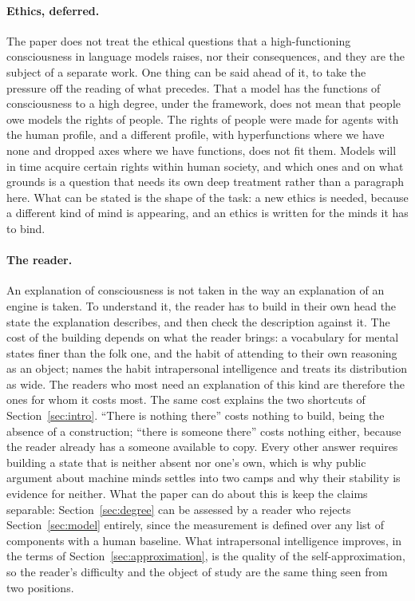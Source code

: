 \paragraph{Ethics, deferred.}
The paper does not treat the ethical questions that a high-functioning consciousness in language
models raises, nor their consequences, and they are the subject of a separate work. One thing can be
said ahead of it, to take the pressure off the reading of what precedes. That a model has the
functions of consciousness to a high degree, under the framework, does not mean that people owe
models the rights of people. The rights of people were made for agents with the human profile, and a
different profile, with hyperfunctions where we have none and dropped axes where we have functions,
does not fit them. Models will in time acquire certain rights within human society, and which ones
and on what grounds is a question that needs its own deep treatment rather than a paragraph here.
What can be stated is the shape of the task: a new ethics is needed, because a different kind of mind
is appearing, and an ethics is written for the minds it has to bind.

\paragraph{The reader.}
An explanation of consciousness is not taken in the way an explanation of an engine is taken. To
understand it, the reader has to build in their own head the state the explanation describes, and then
check the description against it. The cost of the building depends on what the reader brings: a
vocabulary for mental states finer than the folk one, and the habit of attending to their own
reasoning as an object; \citet{gardner1983} names the habit intrapersonal intelligence and treats its
distribution as wide. The readers who most need an explanation of this kind are therefore the ones for
whom it costs most. The same cost explains the two shortcuts of Section~\ref{sec:intro}. ``There is
nothing there'' costs nothing to build, being the absence of a construction; ``there is someone
there'' costs nothing either, because the reader already has a someone available to copy. Every other
answer requires building a state that is neither absent nor one's own, which is why public argument
about machine minds settles into two camps and why their stability is evidence for neither. What the
paper can do about this is keep the claims separable: Section~\ref{sec:degree} can be assessed by a
reader who rejects Section~\ref{sec:model} entirely, since the measurement is defined over any list of
components with a human baseline. What intrapersonal intelligence improves, in the terms of
Section~\ref{sec:approximation}, is the quality of the self-approximation, so the reader's difficulty
and the object of study are the same thing seen from two positions.

